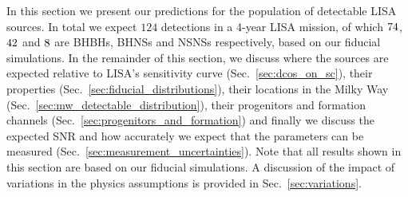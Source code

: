 In this section we present our predictions for the population of detectable LISA sources. In total we expect $124$ detections in a 4-year LISA mission, of which $74{}$, $42{}$ and $8{}$ are BHBHs, BHNSs and NSNSs respectively, based on our fiducial simulations. In the remainder of this section, we discuss where the sources are expected relative to LISA's sensitivity curve (Sec.~\ref{sec:dcos_on_sc}), their properties (Sec.~\ref{sec:fiducial_distributions}), their locations in the Milky Way (Sec.~\ref{sec:mw_detectable_distribution}), their progenitors and formation channels (Sec.~\ref{sec:progenitors_and_formation}) and finally we discuss the expected SNR and how accurately we expect that the parameters can be measured (Sec.~\ref{sec:measurement_uncertainties}). Note that all results shown in this section are based on our fiducial simulations. A discussion of the impact of variations in the physics assumptions is provided in Sec.~\ref{sec:variations}.

